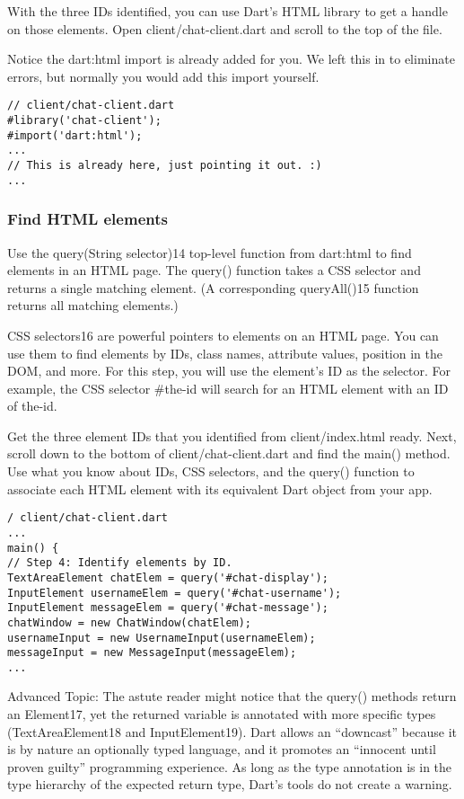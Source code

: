 With the three IDs identified, you can use Dart’s HTML library to get a handle on those elements. Open client/chat-client.dart and scroll to the top of the file.

Notice the dart:html import is already added for you. We left this in to eliminate errors, but normally you would add this import yourself.

\begin{verbatim}
// client/chat-client.dart
#library('chat-client');
#import('dart:html');
...
// This is already here, just pointing it out. :)
...
\end{verbatim}

\subsubsection{Find HTML elements}

Use the query(String selector)14 top-level function from dart:html to find elements in an HTML page. The query() function takes a CSS selector and returns a single matching element. (A corresponding queryAll()15 function returns all matching elements.)

CSS selectors16 are powerful pointers to elements on an HTML page. You can use them to find elements by IDs, class names, attribute values, position in the DOM, and more. For this step, you will use the element’s ID as the selector. For example, the CSS selector \#the-id will search for an HTML element with an ID of the-id.

Get the three element IDs that you identified from client/index.html ready. Next, scroll down to the bottom of client/chat-client.dart and find the main() method. Use what you know about IDs, CSS selectors, and the query() function to associate each HTML element with its equivalent Dart object from your app.

\begin{verbatim}
/ client/chat-client.dart
...
main() {
// Step 4: Identify elements by ID.
TextAreaElement chatElem = query('#chat-display');
InputElement usernameElem = query('#chat-username');
InputElement messageElem = query('#chat-message');
chatWindow = new ChatWindow(chatElem);
usernameInput = new UsernameInput(usernameElem);
messageInput = new MessageInput(messageElem);
...
\end{verbatim}

Advanced Topic: The astute reader might notice that the query() methods return
an Element17, yet the returned variable is annotated with more specific types
(TextAreaElement18 and InputElement19). Dart allows an “downcast” because it is
by nature an optionally typed language, and it promotes an “innocent until proven guilty” programming experience. As long as the type annotation is in the type hierarchy of the expected return type, Dart’s tools do not create a warning.

